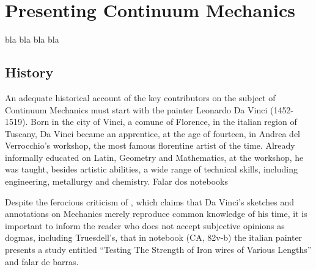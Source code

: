 \chapter{Presenting Continuum Mechanics}\label{ch:Collect}


bla bla bla bla 


\section{History}

An adequate historical account of the key contributors on the subject of Continuum Mechanics must start with the painter Leonardo Da Vinci (1452-1519). Born in the city of Vinci, a comune of Florence, in the italian region of Tuscany, Da Vinci became an apprentice, at the age of fourteen, in Andrea del Verrocchio's workshop, the most famous florentine artist of the time. Already informally educated on Latin, Geometry and Mathematics, at the workshop, he was taught, besides artistic abilities, a wide range of technical skills, including engineering, metallurgy and chemistry.    Falar dos notebooks

Despite the ferocious criticism of \cite{truesdell_1968}, which claims that Da Vinci's sketches and annotations on Mechanics merely reproduce common knowledge of his time, it is important to inform the reader who does not accept subjective opinions as dogmas, including Truesdell's, that in notebook (CA, 82v-b) the italian painter presents a study entitled ``Testing The Strength of Iron wires of Various Lengths'' and falar de barras.     
